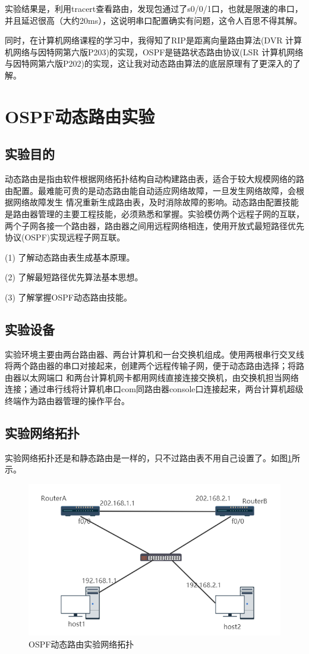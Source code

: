 \documentclass[lang=cn,11pt,a4paper,cite=authoryear]{elegantpaper}
\begin{document}
实验结果是，利用tracert查看路由，发现包通过了s0/0/1口，也就是限速的串口，并且延迟很高（大约20ms），这说明串口配置确实有问题，这令人百思不得其解。

同时，在计算机网络课程的学习中，我得知了RIP是距离向量路由算法(DVR 计算机网络与因特网第六版P203)的实现，OSPF是链路状态路由协议(LSR 计算机网络与因特网第六版P202)的实现，这让我对动态路由算法的底层原理有了更深入的了解。

\section{OSPF动态路由实验}
\subsection{实验目的}

动态路由是指由软件根据网络拓扑结构自动构建路由表，适合于较大规模网络的路由配置。最难能可贵的是动态路由能自动适应网络故障，一旦发生网络故障，会根据网络故障发生 情况重新生成路由表，及时消除故障的影响。动态路由配置技能是路由器管理的主要工程技能，必须熟悉和掌握。实验模仿两个远程子网的互联，两个子网各接一个路由器，路由器之间用远程网络相连，使用开放式最短路径优先协议(OSPF)实现远程子网互联。

(1)	了解动态路由表生成基本原理。

(2)	了解最短路径优先算法基本思想。

(3)	了解掌握OSPF动态路由技能。


\subsection{实验设备}

实验环境主要由两台路由器、两台计算机和一台交换机组成。使用两根串行交叉线将两个路由器的串口对接起来，创建两个远程传输子网，便于动态路由选择；将路由器以太网端口 和两台计算机网卡都用网线直接连接交换机，由交换机担当网络连接；通过串行线将计算机串口com同路由器console口连接起来，两台计算机超级终端作为路由器管理的操作平台。

\subsection{实验网络拓扑}

实验网络拓扑还是和静态路由是一样的，只不过路由表不用自己设置了。如图\ref{fig:screenshot024-3}所示。

\begin{figure}[htbp]
	\centering
	\includegraphics[width=0.7\linewidth]{image/screenshot024}
	\caption{OSPF动态路由实验网络拓扑}
	\label{fig:screenshot024-3}
\end{figure}
\end{document}
